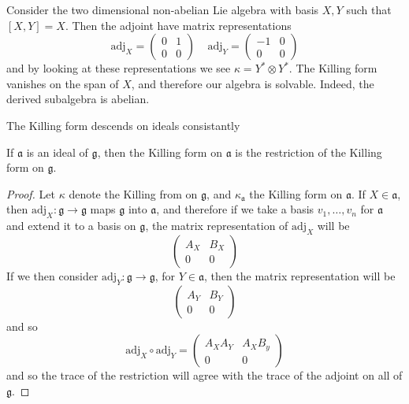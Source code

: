 \begin{example}
    Consider the two dimensional non-abelian Lie algebra with basis $X,Y$ such that $[X,Y] = X$. Then the adjoint have matrix representations
    \[ \text{adj}_X = \begin{pmatrix} 0 & 1 \\ 0 & 0 \end{pmatrix}\ \ \ \ \ \text{adj}_Y = \begin{pmatrix} -1 & 0 \\ 0 & 0 \end{pmatrix} \]
    and by looking at these representations we see $\kappa = Y^* \otimes Y^*$. The Killing form vanishes on the span of $X$, and therefore our algebra is solvable. Indeed, the derived subalgebra is abelian.
\end{example}

The Killing form descends on ideals consistantly

\begin{lemma}
    If $\mathfrak{a}$ is an ideal of $\mathfrak{g}$, then the Killing form on $\mathfrak{a}$ is the restriction of the Killing form on $\mathfrak{g}$.
\end{lemma}
\begin{proof}
    Let $\kappa$ denote the Killing from on $\mathfrak{g}$, and $\kappa_\mathfrak{a}$ the Killing form on $\mathfrak{a}$. If $X \in \mathfrak{a}$, then $\text{adj}_X: \mathfrak{g} \to \mathfrak{g}$ maps $\mathfrak{g}$ into $\mathfrak{a}$, and therefore if we take a basis $v_1, \dots, v_n$ for $\mathfrak{a}$ and extend it to a basis on $\mathfrak{g}$, the matrix representation of $\text{adj}_X$ will be
    \[ \begin{pmatrix} A_X & B_X \\ 0 & 0 \end{pmatrix} \]
    If we then consider $\text{adj}_Y: \mathfrak{g} \to \mathfrak{g}$, for $Y \in \mathfrak{a}$, then the matrix representation will be
    \[ \begin{pmatrix} A_Y & B_Y \\ 0 & 0 \end{pmatrix} \]
    and so
    \[ \text{adj}_X \circ \text{adj}_Y = \begin{pmatrix} A_XA_Y & A_XB_y \\ 0 & 0 \end{pmatrix} \]
    and so the trace of the restriction will agree with the trace of the adjoint on all of $\mathfrak{g}$.
\end{proof}

